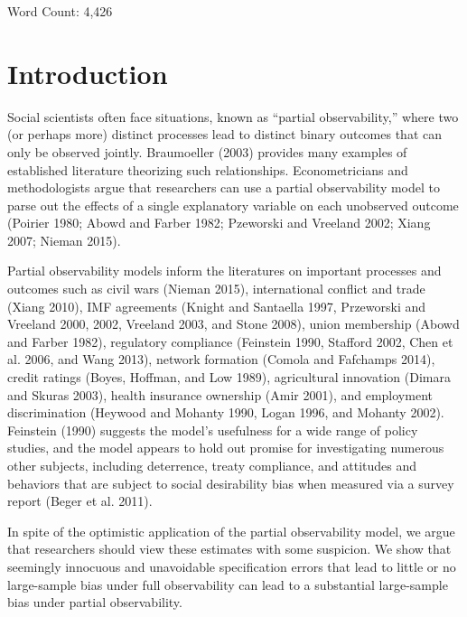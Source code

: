 \documentclass[10pt]{article}
\begin{document}
\vspace{10mm}
\begin{center}
Word Count: 4,426
\end{center}

\thispagestyle{empty}

\newpage
\doublespace

\section*{Introduction}

Social scientists often face situations, known as ``partial observability,'' where two (or perhaps more) distinct processes lead to distinct binary outcomes that can only be observed jointly. 
Braumoeller (2003) provides many examples of established literature theorizing such relationships. 
Econometricians and methodologists argue that researchers can use a partial observability model to parse out the effects of a single explanatory variable on each unobserved outcome (Poirier 1980; Abowd and Farber 1982; Pzeworski and Vreeland 2002; Xiang 2007; Nieman 2015).  

Partial observability models inform the literatures on important processes and outcomes such as civil wars (Nieman 2015), international conflict and trade (Xiang 2010), IMF agreements (Knight and Santaella 1997, Przeworski and Vreeland 2000, 2002, Vreeland 2003, and Stone 2008), union membership (Abowd and Farber 1982), regulatory compliance (Feinstein 1990, Stafford 2002, Chen et al. 2006, and Wang 2013), network formation (Comola and Fafchamps 2014), credit ratings (Boyes, Hoffman, and Low 1989), agricultural innovation (Dimara and Skuras 2003), health insurance ownership (Amir 2001), and employment discrimination (Heywood and Mohanty 1990, Logan 1996, and Mohanty 2002). 
Feinstein (1990) suggests the model's usefulness for a wide range of policy studies, and the model appears to hold out promise for investigating numerous other subjects, including deterrence, treaty compliance, and attitudes and behaviors that are subject to social desirability bias when measured via a survey report (Beger et al. 2011). 

In spite of the optimistic application of the partial observability model, we argue that researchers should view these estimates with some suspicion. 
We show that seemingly innocuous and unavoidable specification errors that lead to little or no large-sample bias under full observability can lead to a substantial large-sample bias under partial observability.
\end{document}

